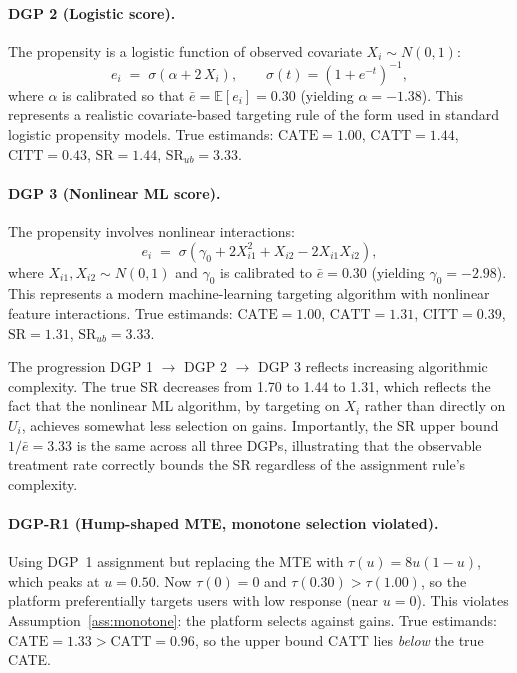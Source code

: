 \documentclass[11pt]{article}
\begin{document}
\paragraph{DGP 2 (Logistic score).}
The propensity is a logistic function of observed covariate $X_i \sim N(0,1)$:
\[
  e_i \;=\; \sigma(\alpha + 2\,X_i), \qquad \sigma(t) = (1+e^{-t})^{-1},
\]
where $\alpha$ is calibrated so that $\bar{e} = \mathbb{E}[e_i] = 0.30$
(yielding $\alpha = -1.38$).  This represents a realistic covariate-based
targeting rule of the form used in standard logistic propensity models.  True
estimands: $\mathrm{CATE} = 1.00$, $\mathrm{CATT} = 1.44$, $\mathrm{CITT} =
0.43$, $\mathrm{SR} = 1.44$, $\mathrm{SR}_{ub} = 3.33$.

\paragraph{DGP 3 (Nonlinear ML score).}
The propensity involves nonlinear interactions:
\[
  e_i \;=\; \sigma\!\left(\gamma_0 + 2X_{i1}^2 + X_{i2} - 2X_{i1}X_{i2}\right),
\]
where $X_{i1}, X_{i2} \sim N(0,1)$ and $\gamma_0$ is calibrated to
$\bar{e} = 0.30$ (yielding $\gamma_0 = -2.98$).  This represents a modern
machine-learning targeting algorithm with nonlinear feature interactions.  True
estimands: $\mathrm{CATE} = 1.00$, $\mathrm{CATT} = 1.31$, $\mathrm{CITT} =
0.39$, $\mathrm{SR} = 1.31$, $\mathrm{SR}_{ub} = 3.33$.

The progression DGP 1 $\to$ DGP 2 $\to$ DGP 3 reflects increasing algorithmic
complexity.  The true SR decreases from 1.70 to 1.44 to 1.31, which reflects
the fact that the nonlinear ML algorithm, by targeting on $X_i$ rather than
directly on $U_i$, achieves somewhat less selection on gains.  Importantly, the
SR upper bound $1/\bar{e} = 3.33$ is the same across all three DGPs, illustrating
that the observable treatment rate correctly bounds the SR regardless of the
assignment rule's complexity.

\paragraph{DGP-R1 (Hump-shaped MTE, monotone selection violated).}
Using DGP~1 assignment but replacing the MTE with
$\tau(u) = 8u(1-u)$,
which peaks at $u = 0.50$.  Now $\tau(0) = 0$ and $\tau(0.30) > \tau(1.00)$,
so the platform preferentially targets users with low response (near $u=0$).
This violates Assumption~\ref{ass:monotone}: the platform selects against gains.
True estimands: $\mathrm{CATE} = 1.33 > \mathrm{CATT} = 0.96$, so the upper
bound $\mathrm{CATT}$ lies \emph{below} the true CATE.
\end{document}

